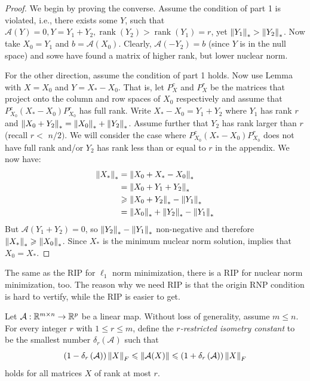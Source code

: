 \documentclass[11pt]{article}
\begin{document}
\begin{proof}
    We begin by proving the converse. Assume the condition of part 1 is violated, i.e., there exists some $Y$, such that $\mathcal{A}(Y)=0, Y=Y_{1}+Y_{2}, \operatorname{rank}\left(Y_{2}\right)>\operatorname{rank}\left(Y_{1}\right)=r$, yet $\left\|Y_{1}\right\|_*>\left\|Y_{2}\right\|_*$. Now take $X_{0}=Y_{1}$ and $b=\mathcal{A}\left(X_{0}\right)$. Clearly, $\mathcal{A}\left(-Y_{2}\right)=b$ (since $Y$ is in the null space) and sowe have found a matrix of higher rank, but lower nuclear norm.

    For the other direction, assume the condition of part 1 holds. Now use Lemma with $X=X_{0}$ and $Y=X_*-X_{0}$. That is, let $P_{X}^{c}$ and $P_{X}^{r}$ be the matrices that project onto the column and row spaces of $X_{0}$ respectively and assume that $P_{X_{0}}^{c}\left(X_*-X_{0}\right) P_{X_{0}}^{r}$ has full rank. Write $X_*-X_{0}=Y_{1}+Y_{2}$ where $Y_{1}$ has rank $r$ and $\left\|X_{0}+Y_{2}\right\|_*=\left\|X_{0}\right\|_*+\left\|Y_{2}\right\|_*$. Assume further that $Y_{2}$ has rank larger than $r$ (recall $r<$ $n / 2)$. We will consider the case where $P_{X_{0}}^{c}\left(X_*-X_{0}\right) P_{X_{0}}^{r}$ does not have full rank and/or $Y_{2}$ has rank less than or equal to $r$ in the appendix. We now have:
    $$
    \begin{aligned}
    \left\|X_*\right\|_* &=\left\|X_{0}+X_*-X_{0}\right\|_* \\
    &=\left\|X_{0}+Y_{1}+Y_{2}\right\|_* \\
    & \geqslant\left\|X_{0}+Y_{2}\right\|_*-\left\|Y_{1}\right\|_* \\
    &=\left\|X_{0}\right\|_*+\left\|Y_{2}\right\|_*-\left\|Y_{1}\right\|_*
    \end{aligned}
    $$
    But $\mathcal{A}\left(Y_{1}+Y_{2}\right)=0$, so $\left\|Y_{2}\right\|_*-\left\|Y_{1}\right\|_*$ non-negative and therefore $\left\|X_*\right\|_* \geqslant\left\|X_{0}\right\|_*$. Since $X_*$ is the minimum nuclear norm solution, implies that $X_{0}=X_*$.
\end{proof}

The same as the RIP for \(\ell_1\) norm minimization, there is a RIP for nuclear norm minimization, too. The reason why we need RIP is that the origin RNP condition is hard to vertify, while the RIP is easier to get.

\begin{definition}
    Let \(\mathcal{A}: \mathbb R^{m \times n}\to\mathbb R^{p}\) be a linear map. Without loss of generality, assume \(m \leqslant n\). For every integer \(r\) with \(1 \leqslant r \leqslant m\), define the \emph{\(r\)-restricted isometry constant} to be the smallest number \(\delta_{r}(\mathcal{A})\) such that
    \[\left(1-\delta_r\left(\mathcal A\right)\right)\left\|X\right\|_F\leqslant\left\|\mathcal A(X)\right\|\leqslant\left(1+\delta_r\left(\mathcal A\right)\right)\left\|X\right\|_F\]
    holds for all matrices \(X\) of rank at most \(r\).
\end{definition}
\end{document}
